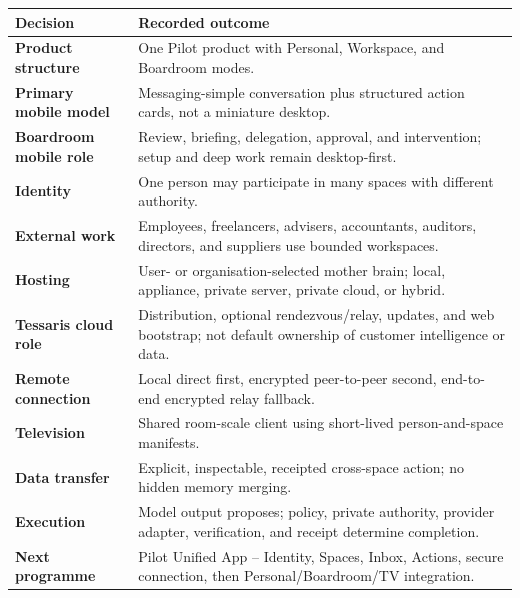 \documentclass[11pt,a4paper]{article}
\begin{document}
\begin{longtable}{@{}>{\bfseries}p{32mm}p{121mm}@{}}
\toprule
Decision & Recorded outcome \\
\midrule
Product structure & One Pilot product with Personal, Workspace, and Boardroom modes. \\
Primary mobile model & Messaging-simple conversation plus structured action cards, not a miniature desktop. \\
Boardroom mobile role & Review, briefing, delegation, approval, and intervention; setup and deep work remain desktop-first. \\
Identity & One person may participate in many spaces with different authority. \\
External work & Employees, freelancers, advisers, accountants, auditors, directors, and suppliers use bounded workspaces. \\
Hosting & User- or organisation-selected mother brain; local, appliance, private server, private cloud, or hybrid. \\
Tessaris cloud role & Distribution, optional rendezvous/relay, updates, and web bootstrap; not default ownership of customer intelligence or data. \\
Remote connection & Local direct first, encrypted peer-to-peer second, end-to-end encrypted relay fallback. \\
Television & Shared room-scale client using short-lived person-and-space manifests. \\
Data transfer & Explicit, inspectable, receipted cross-space action; no hidden memory merging. \\
Execution & Model output proposes; policy, private authority, provider adapter, verification, and receipt determine completion. \\
Next programme & Pilot Unified App -- Identity, Spaces, Inbox, Actions, secure connection, then Personal/Boardroom/TV integration. \\
\bottomrule
\end{longtable}
\end{document}
